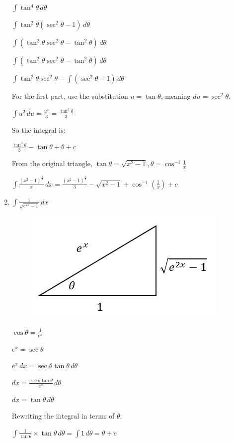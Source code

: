 \documentclass[../main.tex]{subfiles}
\begin{document}
\begin{enumerate}
    \(\int \tan^4{\theta}\,d\theta\)

    \(\int \tan^2{\theta}(\sec^2{\theta}-1)\,d\theta\)

    \(\int (\tan^2{\theta}\sec^2{\theta}-\tan^2{\theta})\,d\theta\)

    \(\int (\tan^2{\theta}\sec^2{\theta}-\tan^2{\theta})\,d\theta\)

    \(\int \tan^2{\theta}\sec^2{\theta}-\int (\sec^2{\theta}-1)\,d\theta\)

    For the first part, use the substitution \(u=\tan{\theta}\), meaning \(du=\sec^2{\theta}\).

    \(\int u^2\,du=\frac{u^3}{3}=\frac{\tan^3{\theta}}{3}\)

    So the integral is:

    \(\frac{\tan^3{\theta}}{3}-\tan{\theta}+\theta+c\)

    From the original triangle, \(\tan{\theta}=\sqrt{x^2-1}, \theta=\cos^{-1}{\frac{1}{x}}\)

    \(\int \frac{(x^2-1)^{\frac{3}{2}}}{x}\,dx=\frac{(x^2-1)^{\frac{3}{2}}}{3}-\sqrt{x^2-1}+\cos^{-1}{(\frac{1}{x})}+c\)

    \item
    $\int \frac{1}{\sqrt{e^{2x}-1}}\,dx$
    \begin{figure}[h]
        \includegraphics{images/trigsub10a.png}
    \end{figure}

    \(\cos{\theta}=\frac{1}{e^x}\)

    \(e^x=\sec{\theta}\)

    \(e^x\,dx=\sec{\theta}\tan{\theta}\,d\theta\)

    \(dx=\frac{\sec{\theta}\tan{\theta}}{e^x}\,d\theta\)

    \(dx=\tan{\theta}\,d\theta\)

    Rewriting the integral in terms of $\theta$:

    \(\int \frac{1}{\tan{\theta}}\times \tan{\theta}\,d\theta=\int 1\,d\theta=\theta+c\)


\end{enumerate}
\end{document}
